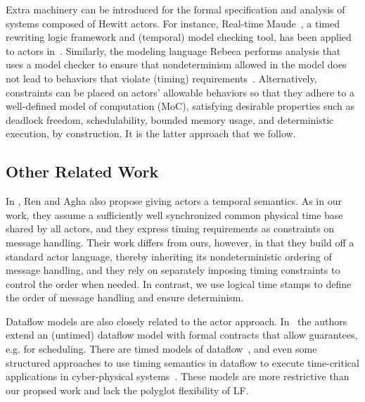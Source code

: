 \documentclass[sigconf]{acmart}
\newcommand{\marten}[1]{\mynote{Marten}{#1}{cyan}}%
\newcommand{\marjan}[1]{\mynote{Marjan}{#1}{magenta}}%
\begin{document}
Extra machinery can be introduced for the formal specification and analysis of systems composed of Hewitt actors.
For instance, Real-time Maude~\cite{olveczky:2008:real}, a timed rewriting logic framework and (temporal) model checking tool, has been applied to actors in~\cite{Ding2003}.
Similarly, the modeling language Rebeca performs analysis that uses a model checker to ensure that nondeterminism allowed in the model does not lead to behaviors that violate (timing) requirements~\cite{KHAMESPANAH2015184}.
Alternatively, constraints can be placed on actors' allowable behaviors so that they adhere to a well-defined model of computation (MoC), satisfying desirable properties such as deadlock freedom, schedulability, bounded memory usage, and deterministic execution, by construction. It is the latter approach that we follow.

\subsection{Other Related Work}
\label{sec:related}

In \cite{ren1995rtsynchronizer}, Ren and Agha also propose giving actors a temporal
semantics. As in our work, they assume a sufficiently well synchronized
common physical time base shared by all actors, and they express timing
requirements as constraints on message handling. Their work differs from
ours, however, in that they build off a standard actor language, thereby
inheriting its nondeterministic ordering of message handling, and they
rely on separately imposing timing constraints to control the order when
needed. In contrast, we use logical time stamps to define the order of
message handling and ensure determinism.

Dataflow models are also closely related to the actor approach. In~\cite{wiik2018contract} the authors extend an (untimed) dataflow model with formal contracts that allow guarantees, e.g. for scheduling.
There are timed models of dataflow~\cite{Sriram:00:Scheduling}, and even some structured approaches to use timing semantics in dataflow to execute time-critical applications in cyber-physical systems~\cite{GeilenEtAl:12:Scenarios}.
These models are more restrictive than our propsed work and lack the polyglot flexibility of LF.
\end{document}
